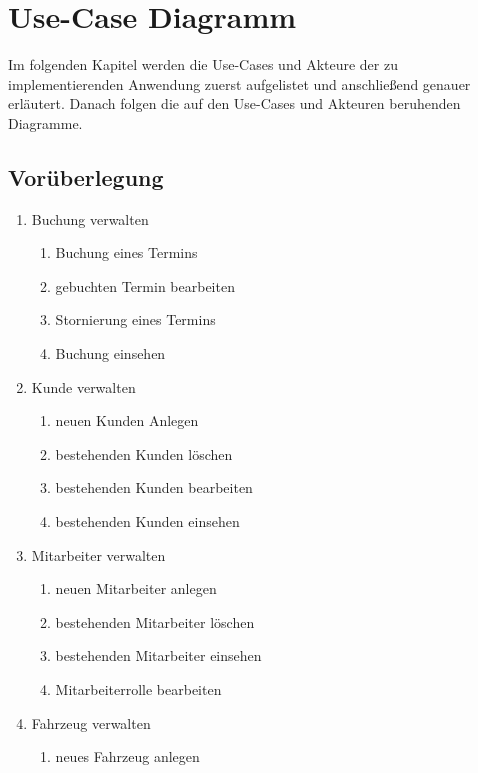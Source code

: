 \chapter{Use-Case Diagramm}

Im folgenden Kapitel werden die Use-Cases und Akteure der zu implementierenden Anwendung zuerst aufgelistet und anschließend genauer erläutert.
Danach folgen die auf den Use-Cases und Akteuren beruhenden Diagramme.

\section{Vorüberlegung}

\begin{enumerate}[itemsep= -0.25 cm]
    \item Buchung verwalten
    \begin{enumerate}[itemsep= -0.25 cm]
        \item Buchung eines Termins
        \item gebuchten Termin bearbeiten
        \item Stornierung eines Termins
        \item Buchung einsehen
    \end{enumerate}
    \item Kunde verwalten
    \begin{enumerate}[itemsep= -0.25 cm]
        \item neuen Kunden Anlegen
        \item bestehenden Kunden löschen
        \item bestehenden Kunden bearbeiten
        \item bestehenden Kunden einsehen
    \end{enumerate}
    \item Mitarbeiter verwalten
    \begin{enumerate}[itemsep= -0.25 cm]
        \item neuen Mitarbeiter anlegen
        \item bestehenden Mitarbeiter löschen
        \item bestehenden Mitarbeiter einsehen
        \item Mitarbeiterrolle bearbeiten
    \end{enumerate}
    \item Fahrzeug verwalten
    \begin{enumerate}[itemsep= -0.25 cm]
        \item neues Fahrzeug anlegen 

\end{enumerate}
\end{enumerate}
